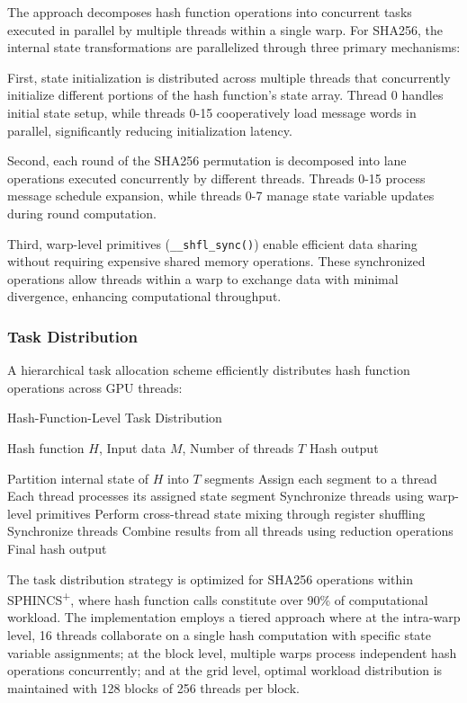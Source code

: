 \documentclass[journal]{IEEEtran}
\begin{document}
The approach decomposes hash function operations into concurrent tasks executed in parallel by multiple threads within a single warp. For SHA256, the internal state transformations are parallelized through three primary mechanisms:

First, state initialization is distributed across multiple threads that concurrently initialize different portions of the hash function's state array. Thread 0 handles initial state setup, while threads 0-15 cooperatively load message words in parallel, significantly reducing initialization latency.

Second, each round of the SHA256 permutation is decomposed into lane operations executed concurrently by different threads. Threads 0-15 process message schedule expansion, while threads 0-7 manage state variable updates during round computation.

Third, warp-level primitives (\texttt{\_\_shfl\_sync()}) enable efficient data sharing without requiring expensive shared memory operations. These synchronized operations allow threads within a warp to exchange data with minimal divergence, enhancing computational throughput.

\subsubsection{Task Distribution}

A hierarchical task allocation scheme efficiently distributes hash function operations across GPU threads:

\begin{algorithm}
  \caption{Hash-Function-Level Task Distribution}
  \begin{algorithmic}[1]
    \REQUIRE Hash function $H$, Input data $M$, Number of threads $T$
    \ENSURE Hash output

    \STATE Partition internal state of $H$ into $T$ segments
    \STATE Assign each segment to a thread
    \STATE Each thread processes its assigned state segment
    \STATE Synchronize threads using warp-level primitives
    \STATE Perform cross-thread state mixing through register shuffling
    \STATE Synchronize threads
    \ENDFOR
    \STATE Combine results from all threads using reduction operations
    \RETURN Final hash output
  \end{algorithmic}
\end{algorithm}

The task distribution strategy is optimized for SHA256 operations within SPHINCS\textsuperscript{+}, where hash function calls constitute over 90\% of computational workload. The implementation employs a tiered approach where at the intra-warp level, 16 threads collaborate on a single hash computation with specific state variable assignments; at the block level, multiple warps process independent hash operations concurrently; and at the grid level, optimal workload distribution is maintained with 128 blocks of 256 threads per block.
\end{document}
